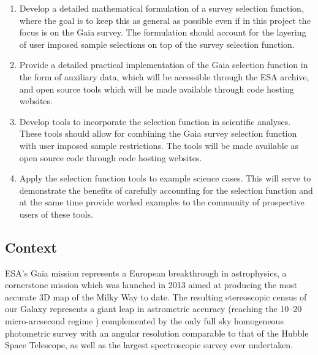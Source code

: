\begin{enumerate}
    \item Develop a detailed mathematical formulation of a survey selection function, where the goal is to keep this
        as general as possible even if in this project the focus is on the Gaia survey.  The formulation should account
        for the layering of user imposed sample selections on top of the survey selection function.
    \item Provide a detailed practical implementation of the Gaia selection function in the form of auxiliary data,
        which will be accessible through the ESA archive, and open source tools which will be made available through
        code hosting websites. 
    \item Develop tools to incorporate the selection function in scientific analyses. These tools should allow for
        combining the Gaia survey selection function with user imposed sample restrictions. The tools will be made
        available as open source code through code hosting websites.
    \item Apply the selection function tools to example science cases. This will serve to demonstrate the benefits of
        carefully accounting for the selection function and at the same time provide worked examples to the community of
        prospective users of these tools.
\end{enumerate}

\subsection{Context}
\label{sec:context}

ESA's Gaia mission \cite{2016A&A...595A...1G} represents a European breakthrough in astrophysics, a cornerstone
mission which was launched in 2013 aimed at producing the most accurate 3D map of the Milky Way to date. The resulting
stereoscopic census of our Galaxy represents a giant leap in astrometric accuracy (reaching the 10--20 micro-arcsecond
regime ) complemented by the only full sky homogeneous photometric survey with an angular resolution comparable to that
of the Hubble Space Telescope, as well as the largest spectroscopic survey ever undertaken. 

